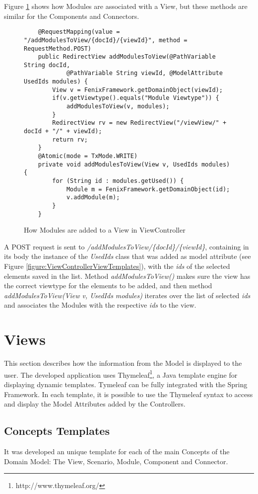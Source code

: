 Figure \ref{figure:ViewControllerAddModules} shows how Modules are associated with a View, but these methods are similar for the Components and Connectors. 
\begin{figure}[h]
\lstset{style=customjava}
\begin{lstlisting}
	@RequestMapping(value = "/addModulesToView/{docId}/{viewId}", method = RequestMethod.POST)
	public RedirectView addModulesToView(@PathVariable String docId,
			@PathVariable String viewId, @ModelAttribute UsedIds modules) {
		View v = FenixFramework.getDomainObject(viewId);
		if(v.getViewtype().equals("Module Viewtype")) {
			addModulesToView(v, modules);
		}
		RedirectView rv = new RedirectView("/viewView/" + docId + "/" + viewId);
		return rv;
	}
	@Atomic(mode = TxMode.WRITE)
	private void addModulesToView(View v, UsedIds modules) {
		for (String id : modules.getUsed()) {
			Module m = FenixFramework.getDomainObject(id);
			v.addModule(m);
		}
	}	
\end{lstlisting}
\caption{How Modules are added to a View in ViewController}
\label{figure:ViewControllerAddModules}
\end{figure}
A POST request is sent to \textit{/addModulesToView/\{docId\}/\{viewId\}}, containing in its body the instance of the \textit{UsedIds} class that was added as model attribute (see Figure \ref{figure:ViewControllerViewTemplates}), with the \textit{ids} of the selected elements saved in the list. Method \textit{addModulesToView()} makes sure the view has the correct viewtype for the elements to be added, and then method \textit{addModulesToView(View v, UsedIds modules)} iterates over the list of selected \textit{ids} and associates the Modules with the respective \textit{ids} to the view.

\section{Views}
\label{section:Views}
This section describes how the information from the Model is displayed to the user. The developed application uses Thymeleaf\footnote{http://www.thymeleaf.org/}, a Java template engine for displaying dynamic templates. Tymeleaf can be fully integrated with the Spring Framework. In each template, it is possible to use the Thymeleaf syntax to access and display the Model Attributes added by the Controllers. 

\subsection{Concepts Templates}
It was developed an unique template for each of the main Concepts of the Domain Model: The View, Scenario, Module, Component and Connector.

